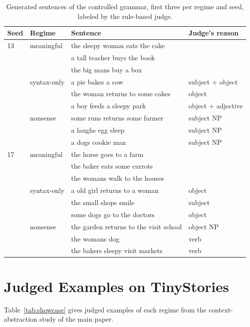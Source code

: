 \documentclass[11pt,letterpaper]{article}
\begin{document}
\begin{table}[h]
\caption{Generated sentences of the controlled grammar, first three per regime and seed, labeled by the rule-based judge.}
\label{tab:r230ex}
\begin{center}
\small
\begin{tabular}{llp{}l}
\toprule
Seed & Regime & Sentence & Judge's reason \\
\midrule
13 & meaningful & the sleepy woman eats the cake &  \\
 &  & a tall teacher buys the book &  \\
 &  & the big mans buy a box &  \\
 & syntax-only & a pie bakes a cow & subject + object \\
 &  & the woman returns to some cakes & object \\
 &  & a boy feeds a sleepy park & object + adjective \\
 & nonsense & some runs returns some farmer & subject NP \\
 &  & a laughs egg sleep & subject NP \\
 &  & a dogs cookie man & subject NP \\
17 & meaningful & the horse goes to a farm &  \\
 &  & the baker eats some carrots &  \\
 &  & the womans walk to the houses &  \\
 & syntax-only & a old girl returns to a woman & object \\
 &  & the small shops smile & subject \\
 &  & some dogs go to the doctors & object \\
 & nonsense & the garden returns to the visit school & object NP \\
 &  & the womans dog & verb \\
 &  & the bakers sleepy visit markets & verb \\
\bottomrule
\end{tabular}
\end{center}
\end{table}


\section{Judged Examples on TinyStories}

Table~\ref{tab:showcase} gives judged examples of each regime from the context-abstraction study of the main paper.
\end{document}

